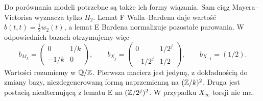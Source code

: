 Do porównania modeli potrzebne są także
ich formy wiązania. Sam ciąg
Mayera--Vietorisa wyznacza tylko $H_2$.
Lemat F Walla--Bardena daje wartość
$b(t,t)=\tfrac12w_2(t)$, a lemat E
Bardena normalizuje pozostałe
parowania. W odpowiednich bazach
otrzymujemy więc
\[
 b_{M_k}=\begin{pmatrix}
 0&1/k\\-1/k&0
 \end{pmatrix},\qquad
 b_{X_j}=\begin{pmatrix}
 0&1/2^j\\-1/2^j&1/2
 \end{pmatrix},\qquad
 b_{X_{-1}}=(1/2).
\]
Wartości rozumiemy w $\mathbb{Q}/\mathbb{Z}$.
Pierwsza macierz jest jedyną, z dokładnością
do zmiany bazy, niezdegenerowaną formą
naprzemienną na $(\mathbb{Z}/k)^2$.
Druga jest postacią niealternującą
z lematu E na $(\mathbb{Z}/2^j)^2$.
W przypadku $X_\infty$ torsji nie ma.

